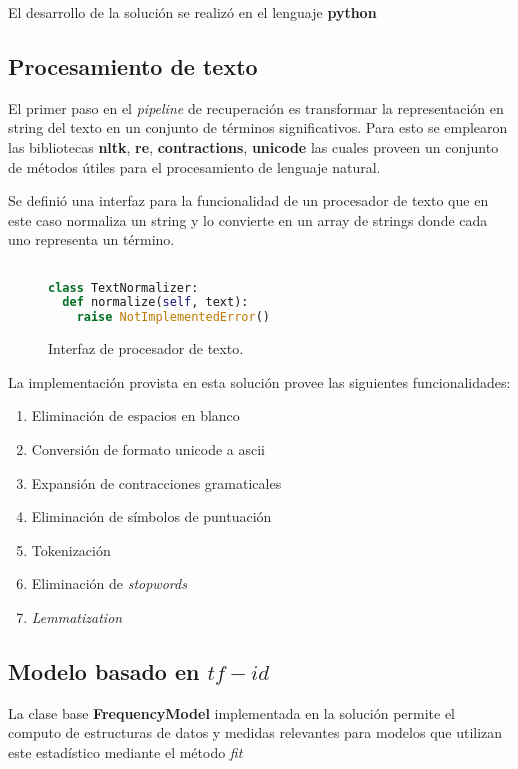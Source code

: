 \documentclass[a4paper,10pt,twocolumn]{article}
\begin{document}
    El desarrollo de la soluci\'on se realiz\'o en el lenguaje \textbf{python} 


	\subsection{Procesamiento de texto}\label{sub:results}
	El primer paso en el \textit{pipeline} de recuperaci\'on es transformar la representaci\'on 
	en string del texto en un conjunto de t\'erminos significativos. Para esto se emplearon las bibliotecas
	\textbf{nltk}, \textbf{re}, \textbf{contractions}, \textbf{unicode} las cuales proveen un
	conjunto de m\'etodos \'utiles para el procesamiento de lenguaje natural.

	Se defini\'o una interfaz para la funcionalidad de un procesador de texto que en este caso
	normaliza un string y lo convierte en un array de strings donde cada uno representa un 
	t\'ermino.

	\begin{figure}[htb]%
		\begin{lstlisting}[language=python]%

class TextNormalizer:
  def normalize(self, text):
    raise NotImplementedError()

		\end{lstlisting}
	\caption{Interfaz de procesador de texto.\label{fig:code}}
	\end{figure}

	La implementaci\'on provista en esta soluci\'on provee las siguientes funcionalidades:
	\begin{enumerate}
		\item Eliminaci\'on de espacios en blanco
		\item Conversi\'on de formato unicode a ascii
		\item Expansi\'on de contracciones gramaticales
		\item Eliminaci\'on de s\'imbolos de puntuaci\'on
		\item Tokenizaci\'on
		\item Eliminaci\'on de \textit{stopwords}
		\item \textit{Lemmatization}
	\end{enumerate}

	\subsection{Modelo basado en $tf-id$}\label{sub:lists}
	La clase base \textbf{FrequencyModel} implementada en la soluci\'on permite el computo de estructuras de datos y medidas relevantes
	para modelos que utilizan este estad\'istico mediante el m\'etodo \textit{fit}
\end{document}
